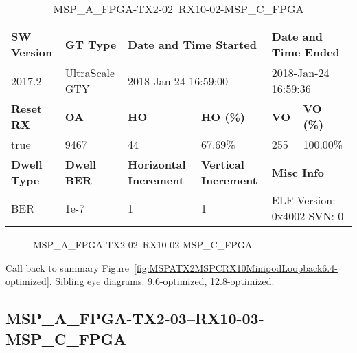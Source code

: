 \begin{table}[h]
\centering
\caption{MSP\_A\_FPGA-TX2-02--RX10-02-MSP\_C\_FPGA}
\label{tab:MSPAFPGATX202RX1002MSPCFPGA6.4-optimized}
\begin{tabular}{@{}|l|l|l|l|l|l|@{}}
\toprule
\textbf{SW Version}                & \textbf{GT Type}   & \multicolumn{2}{l|}{\textbf{Date and Time Started}}            & \multicolumn{2}{l|}{\textbf{Date and Time Ended}}        \\ \midrule
2017.2                       & UltraScale GTY          & \multicolumn{2}{l|}{2018-Jan-24 16:59:00}                   & \multicolumn{2}{l|}{2018-Jan-24 16:59:36}               \\ \midrule
\textbf{Reset RX}                  & \textbf{OA} & \textbf{HO}   & \textbf{HO (\%)} & \textbf{VO} & \textbf{VO (\%)} \\ \midrule
true & 9467        & 44          & 67.69\%        & 255        & 100.00\%       \\ \midrule
\textbf{Dwell Type}                & \textbf{Dwell BER} & \textbf{Horizontal Increment} & \textbf{Vertical Increment}    & \multicolumn{2}{l|}{\textbf{Misc Info}}                  \\ \midrule
BER                            & 1e-7        & 1        & 1           & \multicolumn{2}{l|}{ELF Version: 0x4002 SVN: 0}                         \\ \bottomrule
\end{tabular}
\end{table}

\begin{figure}[h]
\caption{MSP\_A\_FPGA-TX2-02--RX10-02-MSP\_C\_FPGA} \label{fig:MSPAFPGATX202RX1002MSPCFPGA6.4-optimized}
\end{figure}

Call back to summary Figure~\ref{fig:MSPATX2MSPCRX10MinipodLoopback6.4-optimized}.
Sibling eye diagrams: \hyperref[sec:MSPAFPGATX202RX1002MSPCFPGA9.6-optimized]{9.6-optimized}, \hyperref[sec:MSPAFPGATX202RX1002MSPCFPGA12.8-optimized]{12.8-optimized}.

\clearpage
\newpage


\subsection{MSP\_A\_FPGA-TX2-03--RX10-03-MSP\_C\_FPGA}\label{sec:MSPAFPGATX203RX1003MSPCFPGA6.4-optimized}

